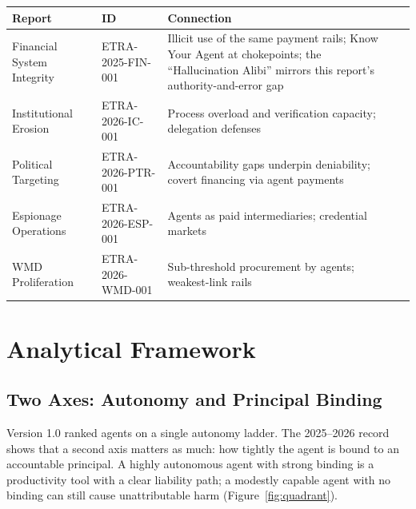 \documentclass[11pt,letterpaper]{article}
\begin{document}
\begin{center}
\small
\begin{tabularx}{\linewidth}{ZY{0.8}Y{0.78}Y{1.42}}
\toprule
\textbf{Report} & \textbf{ID} & \textbf{Connection} \\
\midrule
Financial System Integrity & ETRA-2025-FIN-001 & Illicit use of the same payment rails; Know Your Agent at chokepoints; the ``Hallucination Alibi'' mirrors this report's authority-and-error gap \\
Institutional Erosion & ETRA-2026-IC-001 & Process overload and verification capacity; delegation defenses \\
Political Targeting & ETRA-2026-PTR-001 & Accountability gaps underpin deniability; covert financing via agent payments \\
Espionage Operations & ETRA-2026-ESP-001 & Agents as paid intermediaries; credential markets \\
WMD Proliferation & ETRA-2026-WMD-001 & Sub-threshold procurement by agents; weakest-link rails \\
\bottomrule
\end{tabularx}
\end{center}

\section{Analytical Framework}

\subsection{Two Axes: Autonomy and Principal Binding}

Version 1.0 ranked agents on a single autonomy ladder. The 2025--2026 record shows that a second axis matters as much: how tightly the agent is bound to an accountable principal. A highly autonomous agent with strong binding is a productivity tool with a clear liability path; a modestly capable agent with no binding can still cause unattributable harm (Figure~\ref{fig:quadrant}).
\end{document}

